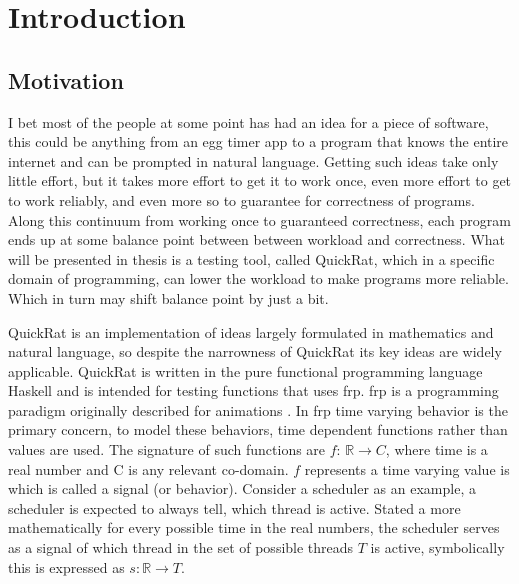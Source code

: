\section{Introduction}
\subsection{Motivation}
\par I bet most of the people at some point has had an idea for a piece of software, this could be anything from an egg timer app to a program that knows the entire internet and can be prompted in natural language. Getting such ideas take only little effort, but it takes more effort to get it to work once, even more effort to get to work reliably, and even more so to guarantee for correctness of programs. Along this continuum from working once to guaranteed correctness, each program ends up at some balance point between between workload and correctness.
What will be presented in thesis is a testing tool, called QuickRat, which in a specific domain of programming, can lower the workload to make programs more reliable. Which in turn may shift balance point by just a bit.

\par QuickRat is an implementation of ideas largely formulated in mathematics and natural language, so despite the narrowness of QuickRat its key ideas are widely applicable. QuickRat is written in the pure functional programming language Haskell and is intended for testing functions that uses \acrfull{frp}. \acrshort{frp} is a programming paradigm originally described for animations \parencite{fran}. In \acrshort{frp} time varying behavior is the primary concern, to model these behaviors, time dependent functions rather than values are used. The signature of such functions are $f:\, \mathbb{R} \rightarrow C$, where time is a real number and C is any relevant co-domain. $f$ represents a time varying value is which is called a signal (or behavior). Consider a scheduler as an example, a scheduler is expected to always tell, which thread is active. Stated a more mathematically for every possible time in the real numbers, the scheduler serves as a signal of which thread in the set of possible threads $T$ is active, symbolically this is expressed as $s:\mathbb{R} \rightarrow T$. 

